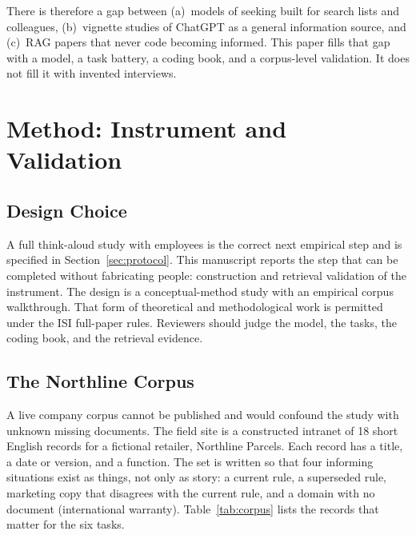 \documentclass{isi2027}
\begin{document}
There is therefore a gap between (a)~models of seeking built for search lists and colleagues, (b)~vignette studies of ChatGPT as a general information source, and (c)~RAG papers that never code becoming informed. This paper fills that gap with a model, a task battery, a coding book, and a corpus-level validation. It does not fill it with invented interviews.

\section{Method: Instrument and Validation}

\subsection{Design Choice}

A full think-aloud study with employees is the correct next empirical step and is specified in Section~\ref{sec:protocol}. This manuscript reports the step that can be completed without fabricating people: construction and retrieval validation of the instrument. The design is a conceptual-method study with an empirical corpus walkthrough. That form of theoretical and methodological work is permitted under the ISI full-paper rules. Reviewers should judge the model, the tasks, the coding book, and the retrieval evidence.

\subsection{The Northline Corpus}

A live company corpus cannot be published and would confound the study with unknown missing documents. The field site is a constructed intranet of 18 short English records for a fictional retailer, Northline Parcels. Each record has a title, a date or version, and a function. The set is written so that four informing situations exist as things, not only as story: a current rule, a superseded rule, marketing copy that disagrees with the current rule, and a domain with no document (international warranty). Table~\ref{tab:corpus} lists the records that matter for the six tasks.
\end{document}
